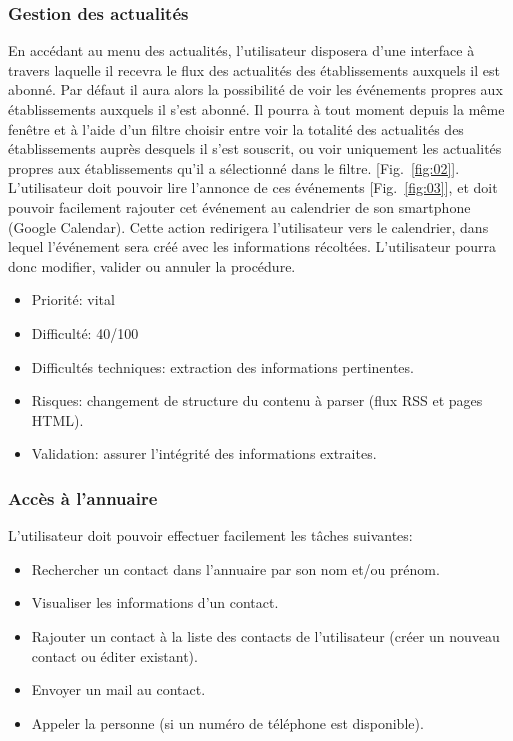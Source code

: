 \documentclass [pdftex,12pt] {report}
\begin{document}
\subsubsection{Gestion des actualités}
En accédant au menu des actualités, l'utilisateur disposera d'une interface à travers laquelle il recevra le flux des actualités des établissements auxquels il est abonné. Par défaut il aura alors la possibilité de voir les événements propres aux établissements auxquels il s'est abonné. Il pourra à tout moment depuis la même fenêtre et à l'aide d'un filtre choisir entre voir la totalité des actualités des établissements auprès desquels il s'est souscrit, ou voir uniquement les actualités propres aux établissements qu'il a sélectionné dans le filtre.  [Fig.~\ref{fig:02}]. L'utilisateur doit pouvoir lire l'annonce de ces événements [Fig.~\ref{fig:03}], et doit pouvoir facilement rajouter cet événement au calendrier de son smartphone (Google Calendar). Cette action redirigera l'utilisateur vers le calendrier, dans lequel l'événement sera créé avec les informations récoltées. L'utilisateur pourra donc modifier, valider ou annuler la procédure. \\

\begin{itemize}
\renewcommand{\labelitemi}{$\bullet$}
\item Priorité: vital
\item Difficulté: 40/100
\item Difficultés techniques: extraction des informations pertinentes.
\item Risques: changement de structure du contenu à parser (flux RSS et pages HTML).
\item Validation: assurer l'intégrité des informations extraites.
\end{itemize}

\subsubsection{Accès à l'annuaire}
L'utilisateur doit pouvoir effectuer facilement les tâches suivantes:\\
\begin{itemize}
\renewcommand{\labelitemi}{$\bullet$}
\item Rechercher un contact dans l'annuaire par son nom et/ou prénom.
\item Visualiser les informations d'un contact.
\item Rajouter un contact à la liste des contacts de l'utilisateur (créer un nouveau contact ou éditer existant).
\item Envoyer un mail au contact.
\item Appeler la personne (si un numéro de téléphone est disponible).
\end{itemize}
\end{document}

